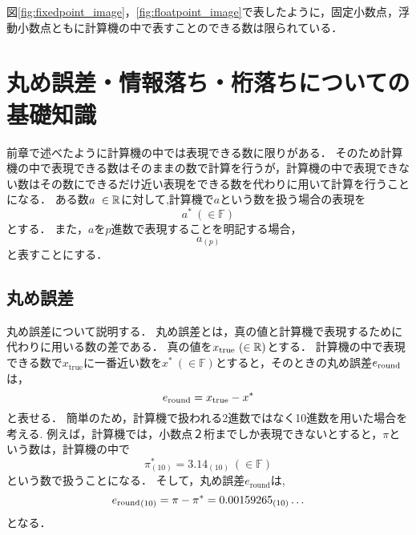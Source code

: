 図\ref{fig:fixedpoint_image}，\ref{fig:floatpoint_image}で表したように，固定小数点，浮動小数点ともに計算機の中で表すことのできる数は限られている．


\section{丸め誤差・情報落ち・桁落ちについての基礎知識}
前章で述べたように計算機の中では表現できる数に限りがある．
そのため計算機の中で表現できる数はそのままの数で計算を行うが，計算機の中で表現できない数はその数にできるだけ近い表現をできる数を代わりに用いて計算を行うことになる．
ある数$a\ \in \mathbb{R}$に対して,計算機で$a$という数を扱う場合の表現を
\begin{equation*}    
    a^{\ast} \ (\in \mathbb{F})
\end{equation*}
とする．
また，$a$を$p$進数で表現することを明記する場合，
\begin{equation*}
    a_{(p)}
\end{equation*}
と表すことにする．
\label{chap:基礎知識2}

\subsection{丸め誤差}
丸め誤差について説明する．
丸め誤差とは，真の値と計算機で表現するために代わりに用いる数の差である．
真の値を$x_{\mathrm{true}} \ (\in \mathbb{R})$とする．
計算機の中で表現できる数で$x_{\mathrm{true}}$に一番近い数を$x^{\ast} \ (\in \mathbb{F})$とすると，そのときの丸め誤差$e_{\mathrm{round}}$は，
\begin{equation*}
    e_{\mathrm{round}} = x_{\mathrm{true}} - x^{\ast}
\end{equation*}
と表せる．
簡単のため，計算機で扱われる2進数ではなく10進数を用いた場合を考える.
例えば，計算機では，小数点２桁までしか表現できないとすると，$\pi$という数は，計算機の中で
\begin{equation*}
    \pi^{\ast}_{(10)} = 3.14_{(10)} \ (\in \mathbb{F})
\end{equation*}
という数で扱うことになる．
そして，丸め誤差$e_{\mathrm{round}}$は,
\begin{equation*}
    {e_{\mathrm{round}}}_{(10)} = \pi - \pi^{\ast} = {0.00159265_{(10)}\dots}
\end{equation*}
となる．


